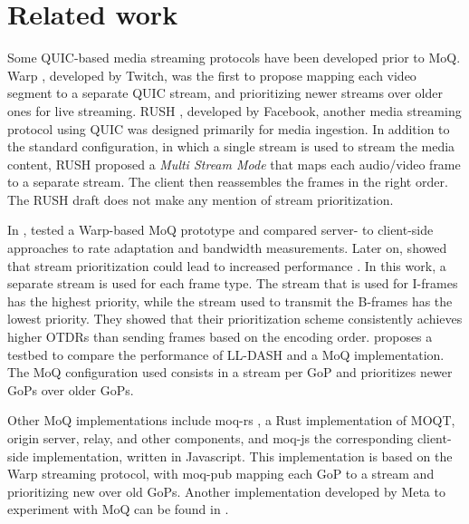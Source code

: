 
\chapter{Related work}\label{chapter:related_work}

Some QUIC-based media streaming protocols have been developed prior to \ac{MoQ}. Warp \parencite{curleyWarpSegmentedLive2022}, developed by Twitch, was the first to propose mapping each video segment to a separate QUIC stream, and prioritizing newer streams over older ones for live streaming. RUSH \parencite{puginRUSHReliableUnreliable2021}, developed by Facebook, another media streaming protocol using QUIC was designed primarily for media ingestion. In addition to the standard configuration, in which a single stream is used to stream the media content, RUSH proposed a \textit{Multi Stream Mode} that maps each audio/video frame to a separate stream. The client then reassembles the frames in the right order. The RUSH draft does not make any mention of stream prioritization. %

In \parencite{gurelMediaQUICInitial2023}, \citeauthor{gurelMediaQUICInitial2023} tested a Warp-based MoQ prototype and compared server- to client-side approaches to rate adaptation and bandwidth measurements. Later on, \citeauthor{gurelThisWayPrioritization2024} showed that stream prioritization could lead to increased performance \parencite{gurelIBC2023TechPapers, gurelThisWayPrioritization2024}. In this work, a separate stream is used for each frame type. The stream that is used for I-frames has the highest priority, while the stream used to transmit the B-frames has the lowest priority. They showed that their prioritization scheme consistently achieves higher \ac{OTDR}s than sending frames based on the encoding order. \parencite{gurelMediaoverQUICTransportVs2024} proposes a testbed to compare the performance of LL-DASH and a MoQ implementation. The MoQ configuration used consists in a stream per GoP and prioritizes newer GoPs over older GoPs.

Other MoQ implementations include moq-rs \parencite{kixelatedKixelatedMoqrs2024}, a Rust implementation of \ac{MOQT}, origin server, relay, and other components, and moq-js \parencite{kixelatedKixelatedMoqjs2024} the corresponding client-side implementation, written in Javascript. This implementation is based on the Warp streaming protocol, with moq-pub mapping each GoP to a stream and prioritizing new over old GoPs. Another implementation developed by Meta to experiment with MoQ can be found in \parencite{FacebookexperimentalMoqencoderplayer2024}.